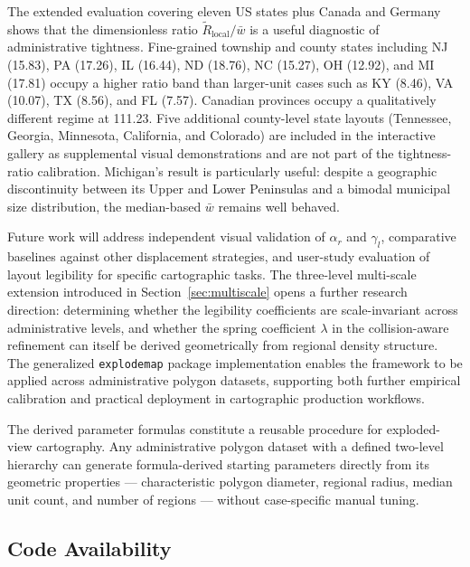 \documentclass[12pt, a4paper]{article}
\numberwithin{equation}{section}
\begin{document}
The extended evaluation covering eleven US states plus Canada and Germany shows that the dimensionless ratio $\widetilde{R}_{\text{local}}/\bar{w}$ is a useful diagnostic of administrative tightness. Fine-grained township and county states including NJ (15.83), PA (17.26), IL (16.44), ND (18.76), NC (15.27), OH (12.92), and MI (17.81) occupy a higher ratio band than larger-unit cases such as KY (8.46), VA (10.07), TX (8.56), and FL (7.57). Canadian provinces occupy a qualitatively different regime at 111.23. Five additional county-level state layouts (Tennessee, Georgia, Minnesota, California, and Colorado) are included in the interactive gallery as supplemental visual demonstrations and are not part of the tightness-ratio calibration. Michigan's result is particularly useful: despite a geographic discontinuity between its Upper and Lower Peninsulas and a bimodal municipal size distribution, the median-based $\bar{w}$ remains well behaved.

Future work will address independent visual validation of $\alpha_r$ and $\gamma_l$, comparative baselines against other displacement strategies, and user-study evaluation of layout legibility for specific cartographic tasks. The three-level multi-scale extension introduced in Section~\ref{sec:multiscale} opens a further research direction: determining whether the legibility coefficients are scale-invariant across administrative levels, and whether the spring coefficient $\lambda$ in the collision-aware refinement can itself be derived geometrically from regional density structure. The generalized \texttt{explodemap} package implementation enables the framework to be applied across administrative polygon datasets, supporting both further empirical calibration and practical deployment in cartographic production workflows.

The derived parameter formulas constitute a reusable procedure for exploded-view cartography. Any administrative polygon dataset with a defined two-level hierarchy can generate formula-derived starting parameters directly from its geometric properties --- characteristic polygon diameter, regional radius, median unit count, and number of regions --- without case-specific manual tuning.

\subsection*{Code Availability}

\end{document}
